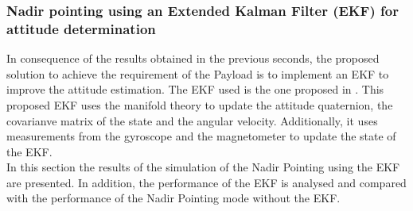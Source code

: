 \subsubsection{Nadir pointing using an Extended Kalman Filter (EKF) for attitude determination}
In consequence of the results obtained in the previous seconds, the proposed solution to achieve
the requirement of the Payload is to implement an EKF to improve the attitude estimation. 
The EKF used is the one proposed in \cite{EKF}. This proposed EKF uses the manifold theory to update
the attitude quaternion, the covarianve matrix of the state and the angular velocity. Additionally, it uses measurements
from the gyroscope and the magnetometer to update the state of the EKF.\\

\noindent In this section the results of the simulation of the Nadir Pointing using the EKF are presented.
In addition, the performance of the EKF is analysed and compared with the performance of the Nadir Pointing mode without the EKF.

